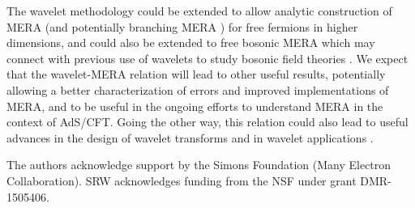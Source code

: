 \documentclass[aps,prl,twocolumn,showpacs,superscriptaddress,floatfix,10pt]{revtex4-1}
\begin{document}
The wavelet methodology could be extended to allow analytic construction of MERA (and
potentially branching MERA \cite{Branching}) for free fermions in higher
dimensions, and could also be extended to free bosonic MERA \cite{MERAbose}
which may connect with previous use of wavelets to study bosonic field theories
\cite{FieldWavelets}. We expect that the wavelet-MERA relation will lead to
other useful results, potentially allowing a better characterization of errors
and improved implementations of MERA, and to be useful in the ongoing efforts
to understand MERA in the context of AdS/CFT. Going the other way, this
relation could also lead to useful advances in the design of wavelet transforms and in wavelet applications \cite{LongWavelet}.

The authors acknowledge support by the Simons Foundation (Many Electron
Collaboration). SRW acknowledges funding  from the NSF under grant DMR-1505406.
\end{document}
